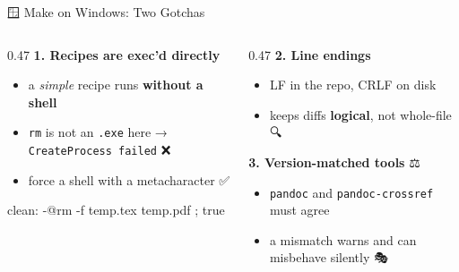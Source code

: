 \documentclass[
  10pt,
  ignorenonframetext,
  serif,
  aspectratio=169]{beamer}
\newenvironment{Shaded}{}{}
\newcommand{\NormalTok}[1]{#1}
\providecommand{\tightlist}{%
  \setlength{\itemsep}{0pt}\setlength{\parskip}{0pt}}
\begin{document}
\begin{frame}[fragile]{🪟 Make on Windows: Two Gotchas}
\protect{}\label{make-on-windows-two-gotchas}
\begin{columns}[T]
\begin{column}{0.47\linewidth}
\textbf{1. Recipes are exec'd directly} 🐚

\begin{itemize}
\tightlist
\item
  a \emph{simple} recipe runs \textbf{without a shell}
\item
  \texttt{rm} is not an \texttt{.exe} here →
  \texttt{CreateProcess\ failed} ❌
\item
  force a shell with a metacharacter ✅
\end{itemize}

\begin{Shaded}
\begin{Highlighting}[]
\NormalTok{clean:}
\NormalTok{    {-}@rm {-}f temp.tex temp.pdf ; true}
\end{Highlighting}
\end{Shaded}
\end{column}

\begin{column}{0.47\linewidth}
\textbf{2. Line endings} 📏

\begin{itemize}
\tightlist
\item
  LF in the repo, CRLF on disk
\item
  keeps diffs \textbf{logical}, not whole-file 🔍
\end{itemize}

\textbf{3. Version-matched tools} ⚖️

\begin{itemize}
\tightlist
\item
  \texttt{pandoc} and \texttt{pandoc-crossref} must agree
\item
  a mismatch warns and can misbehave silently 🎭
\end{itemize}
\end{column}
\end{columns}
\end{frame}
\end{document}
